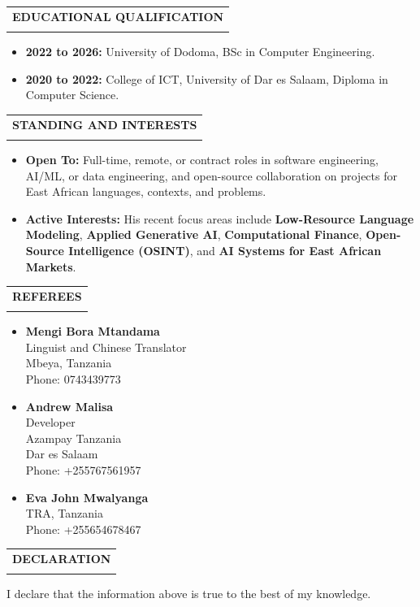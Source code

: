 \documentclass[12pt,a4paper]{article}
\makeatletter
\newcommand{\dottedsection}[1]{%
  \par\vspace{1.5em}%
  \noindent
  \begin{tabular}{@{}l@{}}
    {\large\textbf{\uppercase{#1}}} \\[-0.6em]
    \makebox[\widthof{\large\textbf{\uppercase{#1}}}]{\dotfill}
  \end{tabular}%
  \par\vspace{0.5em}%
}
\makeatother
\begin{document}
\vspace{1em}

\dottedsection{Educational Qualification}
\begin{itemize}[leftmargin=1.5em, itemsep=0pt, parsep=0pt, topsep=2pt]
    \item \textbf{2022 to 2026:} University of Dodoma, BSc in Computer Engineering.
    \item \textbf{2020 to 2022:} College of ICT, University of Dar es Salaam, Diploma in Computer Science.
\end{itemize}

\vspace{1em}

\dottedsection{Standing and Interests}
\begin{itemize}[leftmargin=1.5em, itemsep=0pt, parsep=0pt, topsep=2pt]
    \item \textbf{Open To:} Full-time, remote, or contract roles in software engineering, AI/ML, or data engineering, and open-source collaboration on projects for East African languages, contexts, and problems.
    \item \textbf{Active Interests:} His recent focus areas include \textbf{Low-Resource Language Modeling}, \textbf{Applied Generative AI}, \textbf{Computational Finance}, \textbf{Open-Source Intelligence (OSINT)}, and \textbf{AI Systems for East African Markets}.
\end{itemize}

\vspace{1em}

\dottedsection{Referees}
\begin{itemize}[leftmargin=1.5em, itemsep=0pt, parsep=0pt, topsep=2pt]
    \item \textbf{Mengi Bora Mtandama} \\
    Linguist and Chinese Translator \\
    Mbeya, Tanzania \\
    Phone: 0743439773

    \item \textbf{Andrew Malisa} \\
    Developer \\
    Azampay Tanzania \\
    Dar es Salaam \\
    Phone: +255767561957

    \item \textbf{Eva John Mwalyanga} \\
    TRA, Tanzania \\
    Phone: +255654678467
\end{itemize}

\vspace{1em}

\dottedsection{Declaration}
\noindent I declare that the information above is true to the best of my knowledge.

\vspace{10pt}
\noindent {} \\
 \\
\end{document}
